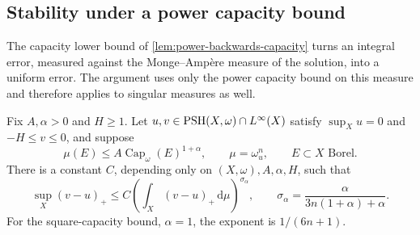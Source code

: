 \subsection{Stability under a power capacity bound}
\label{subsec:capacity-square-stability}\label{subsec:power-capacity-stability}

The capacity lower bound of \cref{lem:power-backwards-capacity} turns an integral error, measured against the Monge--Amp\`ere measure of the solution, into a uniform error. The argument uses only the power capacity bound on this measure and therefore applies to singular measures as well.

\begin{proposition}\label{prop:capacity-square-one-sided-stability}\label{prop:power-capacity-one-sided-stability}
Fix $A,\alpha>0$ and $H\geq1$. Let $u,v\in\mathrm{PSH}(X,\omega)\cap L^\infty(X)$ satisfy $\sup_Xu=0$ and $-H\leq v\leq0$, and suppose
\[
 \mu(E)\leq A\operatorname{Cap}_\omega(E)^{1+\alpha},
 \qquad \mu=\omega_u^n,
 \qquad E\subset X\text{ Borel}.
\]
There is a constant $C$, depending only on $(X,\omega),A,\alpha,H$, such that
\begin{equation}\label{eq:power-one-sided-stability}
 \sup_X(v-u)_+
 \leq C\left(\int_X(v-u)_+\,\mathrm d\mu\right)^{\sigma_\alpha},
 \qquad \sigma_\alpha=\frac{\alpha}{3n(1+\alpha)+\alpha}.
\end{equation}
For the square-capacity bound, $\alpha=1$, the exponent is $1/(6n+1)$.
\end{proposition}
